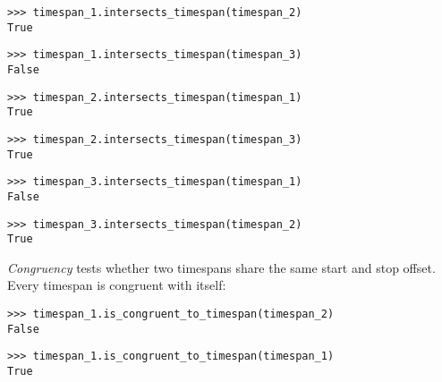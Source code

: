 \begin{comment}
<abjad>
timespan_1.intersects_timespan(timespan_2)
timespan_1.intersects_timespan(timespan_3)
timespan_2.intersects_timespan(timespan_1)
timespan_2.intersects_timespan(timespan_3)
timespan_3.intersects_timespan(timespan_1)
timespan_3.intersects_timespan(timespan_2)
</abjad>
\end{comment}

\begin{abjadbookoutput}
\begin{singlespacing}
\vspace{-0.5\baselineskip}
\begin{lstlisting}
>>> timespan_1.intersects_timespan(timespan_2)
True
\end{lstlisting}
\begin{lstlisting}
>>> timespan_1.intersects_timespan(timespan_3)
False
\end{lstlisting}
\begin{lstlisting}
>>> timespan_2.intersects_timespan(timespan_1)
True
\end{lstlisting}
\begin{lstlisting}
>>> timespan_2.intersects_timespan(timespan_3)
True
\end{lstlisting}
\begin{lstlisting}
>>> timespan_3.intersects_timespan(timespan_1)
False
\end{lstlisting}
\begin{lstlisting}
>>> timespan_3.intersects_timespan(timespan_2)
True
\end{lstlisting}
\end{singlespacing}
\end{abjadbookoutput}

\noindent \emph{Congruency} tests whether two timespans share the same start
and stop offset. Every timespan is congruent with itself:

\begin{comment}
<abjad>
timespan_1.is_congruent_to_timespan(timespan_2)
timespan_1.is_congruent_to_timespan(timespan_1)
</abjad>
\end{comment}

\begin{abjadbookoutput}
\begin{singlespacing}
\vspace{-0.5\baselineskip}
\begin{lstlisting}
>>> timespan_1.is_congruent_to_timespan(timespan_2)
False
\end{lstlisting}
\begin{lstlisting}
>>> timespan_1.is_congruent_to_timespan(timespan_1)
True
\end{lstlisting}
\end{singlespacing}
\end{abjadbookoutput}


